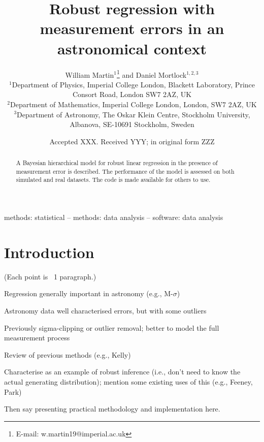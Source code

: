 \documentclass[fleqn,usenatbib]{mnras}
\title[Robust regression for astronomy]{Robust regression with measurement errors in an astronomical context}
\author[W. Martin et al.]{
William Martin$^{1}$\thanks{E-mail: w.martin19@imperial.ac.uk}
and Daniel Mortlock$^{1,2,3}$
\\
$^{1}$Department of Physics, Imperial College London, Blackett Laboratory, Prince Consort Road, London SW7 2AZ, UK\\
$^{2}$Department of Mathematics, Imperial College London, London, SW7 2AZ, UK\\
$^{3}$Department of Astronomy, The Oskar Klein Centre, Stockholm University, Albanova, SE-10691 Stockholm, Sweden
}
\date{Accepted XXX. Received YYY; in original form ZZZ}
\begin{document}
\label{firstpage}
\pagerange{\pageref{firstpage}--\pageref{lastpage}}
\maketitle

\begin{abstract}
A Bayesian hierarchical model for robust linear regression in the presence of measurement error is described.
The performance of the model is assessed on both simulated and real datasets.
The code is made available for others to use.
\end{abstract}

\begin{keywords}
methods: statistical -- methods: data analysis -- software: data analysis
\end{keywords}



\section{Introduction}
\label{sec:intro}

{\color{red}

(Each point is ~1 paragraph.)

Regression generally important in astronomy (e.g., M-$\sigma$)

Astronomy data well characterised errors, but with some outliers

Previously sigma-clipping or outlier removal; better to model the full measurement process

Review of previous methods (e.g., Kelly)

Characterise as an example of robust inference (i.e., don't need to know the actual generating distribution); mention some existing uses of this (e.g., Feeney, Park)

Then say presenting practical methodology and implementation here.
}
\end{document}
